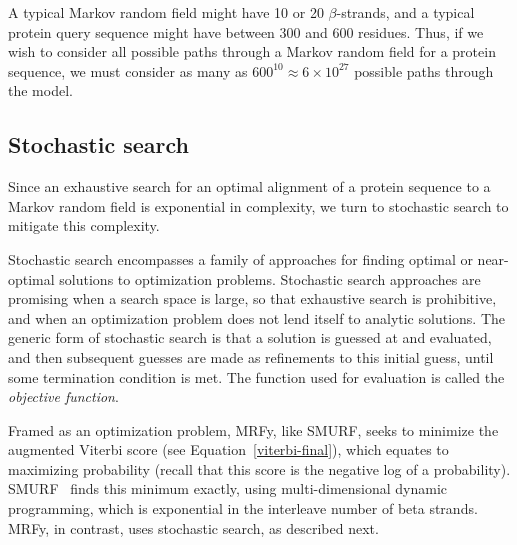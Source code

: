 \documentclass{acm_proc_article-sp}
\begin{document}

A typical Markov random field might have 10 or 20 $\beta$-strands, and a typical
protein query sequence might have between 300 and 600 residues.
Thus, if we wish to consider all possible paths through a Markov random field
for a protein sequence, we must consider as many as 
$600^{10} \approx 6 \times 10^{27}$ possible paths through the model.

\subsection{Stochastic search}

Since an exhaustive search for an optimal alignment of a protein sequence to a
Markov random field is exponential in complexity, we turn to stochastic search
to mitigate this complexity.

Stochastic search encompasses a family of approaches for finding optimal or
near-optimal solutions to optimization problems.
Stochastic search approaches are promising when a search space is large, so that
exhaustive search is prohibitive, and when an optimization problem does not lend
itself to analytic solutions.
The generic form of stochastic search is that a solution is guessed at and 
evaluated, and then subsequent guesses are made as refinements to this initial
guess, until some termination condition is met.
The function used for evaluation is called the \emph{objective function}.

Framed as an optimization problem, MRFy, like SMURF, seeks to minimize the 
augmented Viterbi
score (see Equation~\ref{viterbi-final}), which equates to maximizing 
probability (recall that this score is the negative log of a probability).
SMURF~\cite{Menke:2010ti} finds this minimum exactly, using multi-dimensional dynamic programming,
which is exponential in the interleave number of beta strands.
MRFy, in contrast, uses stochastic search, as described next.
\end{document}
